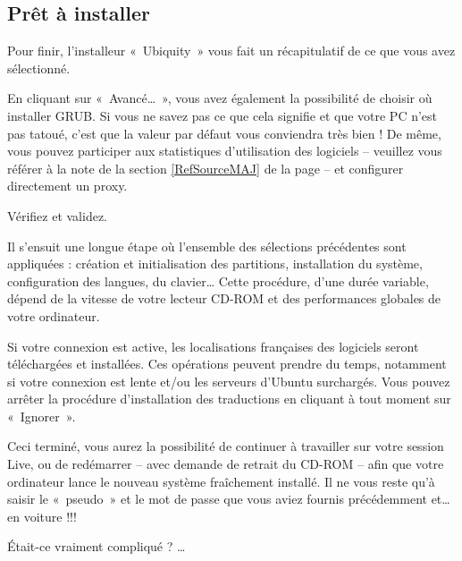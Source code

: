 \subsection{Prêt à installer}
Pour finir, l'installeur «~Ubiquity~» vous fait un récapitulatif de ce que vous avez sélectionné.\par
{}
\begin{nota}
En cliquant sur «~Avancé\dots{}~», vous avez également la possibilité de choisir où installer GRUB. Si vous ne savez pas ce que cela signifie et que votre PC n'est pas tatoué, c'est que la valeur par défaut vous conviendra très bien ! De même, vous pouvez participer aux statistiques d'utilisation des logiciels -- veuillez vous référer à la note de la section \ref{RefSourceMAJ} de la page \pageref{RefSourceMAJ} -- et configurer directement un proxy.
\end{nota}
Vérifiez et validez.\par
Il s'ensuit une longue étape où l'ensemble des sélections précédentes sont appliquées : création et initialisation des partitions, installation du système, configuration des langues, du clavier\ldots{} Cette procédure, d'une durée variable, dépend de la vitesse de votre lecteur CD-ROM et des performances globales de votre ordinateur.\par
{}
Si votre connexion  est active, les localisations françaises des logiciels seront téléchargées et installées. Ces opérations peuvent prendre du temps, notamment si votre connexion est lente et/ou les serveurs d'Ubuntu surchargés. Vous pouvez arrêter la procédure d'installation des traductions en cliquant à tout moment sur «~Ignorer~».\par
{}
Ceci terminé, vous aurez la possibilité de continuer à travailler sur votre session Live, ou de redémarrer -- avec demande de retrait du CD-ROM -- afin que votre ordinateur lance le nouveau système fraîchement installé. Il ne vous reste qu'à saisir le «~pseudo~» et le mot de passe que vous aviez fournis précédemment et\ldots{} en voiture !!!\par
{}
Était-ce vraiment compliqué ? \ldots{}

